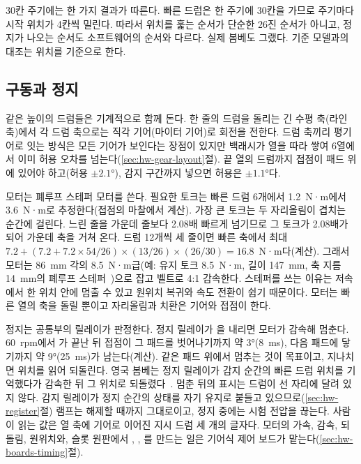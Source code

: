 30칸 주기에는 한 가지 결과가 따른다. 빠른 드럼은 한 주기에 30칸을 가므로 주기마다 시작 위치가 4칸씩 밀린다.
따라서 위치를 훑는 순서가 단순한 26진 순서가 아니고, 정지가 나오는 순서도 소프트웨어의 순서와 다르다.
실제 봄베도 그랬다. 기준 모델과의 대조는 위치를 기준으로 한다.

\subsection{구동과 정지}

같은 높이의 드럼들은 기계적으로 함께 돈다. 한 줄의 드럼을 돌리는 긴 수평 축(라인 축)에서 각 드럼 축으로는
직각 기어(마이터 기어)로 회전을 전한다. 드럼 축끼리 평기어로 잇는 방식은 모든 기어가 보인다는 장점이 있지만
백래시가 열을 따라 쌓여 6열에서 이미 허용 오차를 넘는다(\ref{sec:hw-gear-layout}절). 끝 열의 드럼까지 접점이
패드 위에 있어야 하고(허용 $\pm 2.1$°), 감지 구간까지 넣으면 허용은 $\pm 1.1$°다.

모터는 폐루프 스테퍼 모터를 쓴다. 필요한 토크는 빠른 드럼 6개에서 1.2~N·m에서 3.6~N·m로 추정한다(접점의
마찰에서 계산). 가장 큰 토크는 두 자리올림이 겹치는 순간에 걸린다. 느린 줄을 가운데 줄보다 2.08배 빠르게
넘기므로 그 토크가 2.08배가 되어 가운데 축을 거쳐 온다. 드럼 12개씩 세 줄이면 빠른 축에서 최대
$7.2 + (7.2 + 7.2 \times 54/26) \times (13/26) \times (26/30) = 16.8$~N·m다(계산). 그래서 모터는 86~mm 각의
8.5~N·m급(예: 유지 토크 8.5~N·m, 길이 147~mm, 축 지름 14~mm의 폐루프 스테퍼~\cite{leadshine-csm23485})으로 잡고
벨트로 4:1 감속한다. 스테퍼를 쓰는 이유는 저속에서 한 위치 안에 멈출 수 있고 원위치 복귀와 속도 전환이 쉽기
때문이다. 모터는 빠른 열의 축을 돌릴 뿐이고 자리올림과 치환은 기어와 접점이 한다.

정지는 공통부의 릴레이가 판정한다. 정지 릴레이가 을 내리면 모터가 감속해 멈춘다. 60~rpm에서
가 끝난 뒤 접점이 그 패드를 벗어나기까지 약 3°(8~ms), 다음 패드에 닿기까지 약 9°(25~ms)가
남는다(계산). 같은 패드 위에서 멈추는 것이 목표이고, 지나치면 위치를 읽어 되돌린다. 영국 봄베는 정지
릴레이가 감지 순간의 빠른 드럼 위치를 기억했다가 감속한 뒤 그 위치로 되돌렸다~\cite{jackson-bh10}.
멈춘 뒤의 표시는 드럼이 선 자리에 달려 있지 않다. 감지 릴레이가 정지 순간의 상태를 자기 유지로 붙들고
있으므로(\ref{sec:hw-register}절) 램프는 해제할 때까지 그대로이고, 정지 중에는 시험 전압을 끊는다. 사람이 읽는 값은 열 축에
기어로 이어진 지시 드럼 세 개의 글자다. 모터의 가속, 감속, 되돌림, 원위치와, 슬롯 원판에서 ,
, 를 만드는 일은 기어식 제어 보드가 맡는다(\ref{sec:hw-boards-timing}절).

